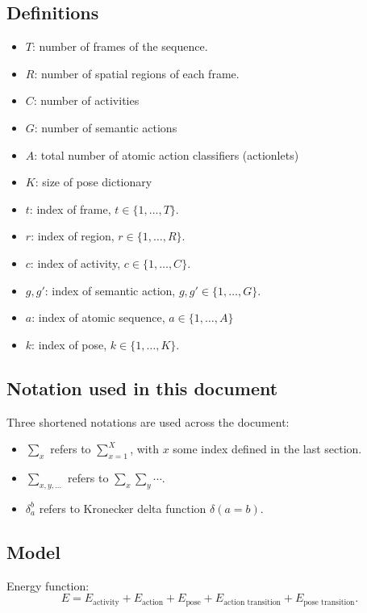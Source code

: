\documentclass[10pt,letterpaper]{article}
\newcommand{\+}[1]{\ensuremath{{\boldsymbol #1}}}
\begin{document}
\subsection*{Definitions}
\begin{itemize}
\item $T$: number of frames of the sequence.
\item $R$: number of spatial regions of each frame.
\item $C$: number of activities
\item $G$: number of semantic actions
\item $A$: total number of atomic action classifiers (actionlets)
\item $K$: size of pose dictionary
\item $t$: index of frame, $t \in \{1,\dots,T\}$.
\item $r$: index of region, $r \in \{1,\dots,R\}$.
\item $c$: index of activity, $c \in \{1,\dots,C\}$.
\item $g,g'$: index of semantic action, $g,g' \in \{1,\dots,G\}$.
\item $a$: index of atomic sequence, $a \in \{1,\dots,A\}$
\item $k$: index of pose, $k \in \{1,\dots,K\}$.
\end{itemize}

\subsection*{Notation used in this document}
Three shortened notations are used across the document:
\begin{itemize}
\item $\sum_x$ refers to $\sum_{x=1}^X$, with $x$ some index defined in the last section.
\item $\sum_{x,y,...}$ refers to $\sum_x \sum_y \cdots$.
\item $\delta_a^b$ refers to Kronecker delta function $\delta(a = b)$.
\end{itemize}


\subsection{Model}

Energy function:
\begin{equation}
E = E_{\text{activity}} + E_{\text{action}} + E_{\text{pose}}
  + E_{\text{action transition}} + E_{\text{pose transition}}.
\end{equation}
\end{document}
